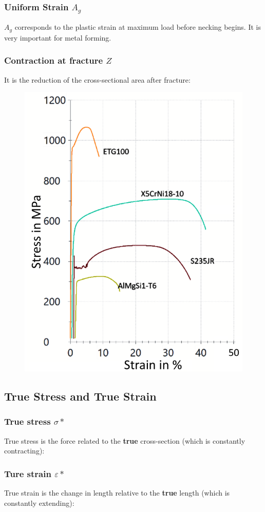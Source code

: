 \documentclass{article}
\begin{document}
\subsubsection{Uniform Strain $A_g$}
$A_g$ corresponds to the plastic strain at maximum load before necking begins.
It is very important for metal forming.

\subsubsection{Contraction at fracture $Z$}
It is the reduction of the cross-sectional area after fracture:

\newpage
\begin{figure}
  \centering
  \includegraphics[width=.4\textwidth]{media/stress-strain_real-samples.png}
\end{figure}

\phantom{}

\subsection{True Stress and True Strain}
\subsubsection{True stress $\sigma*$}
True stress is the force related to the \textbf{true} cross-section
(which is constantly contracting):

\subsubsection{Ture strain $\varepsilon*$}
True strain is the change in length relative to the \textbf{true}
length (which is constantly extending):
\wrapfill
\end{document}
